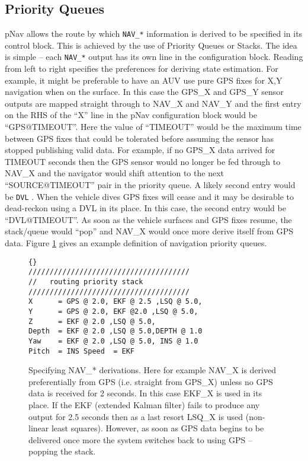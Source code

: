 \documentclass[a4paper,10pt]{article}
\newcommand{\Code}[1]{\texttt{#1} }
\newcommand{\code}[1]{\Code{#1} }
\begin{document}
\subsection{Priority Queues}
pNav allows the route by which \code{NAV\_*} information is
derived to be specified in its control block. This is achieved by
the use of Priority Queues or Stacks. The idea is simple -- each
\code{NAV\_*} output has its own line in the configuration block.
Reading from left to right specifies the preferences for deriving
state estimation. For example, it might be preferable to have an
AUV use pure GPS fixes for X,Y navigation when on the surface. In
this case the GPS\_X and GPS\_Y sensor outputs are mapped straight
through to NAV\_X and NAV\_Y and the first entry on the RHS of the ``X'' line
in the pNav configuration block would be ``GPS@TIMEOUT''. Here the
value of ``TIMEOUT'' would be the maximum time between GPS fixes
that could be tolerated before assuming the sensor has stopped
publishing valid data. For example, if no GPS\_X data arrived for
TIMEOUT seconds then the GPS sensor would no longer be fed through
to NAV\_X and the navigator would shift attention to the next
``SOURCE@TIMEOUT'' pair in the priority queue. A likely second
entry would be \code{DVL}. When the vehicle dives GPS fixes will
cease and it may be desirable to dead-reckon using a DVL in its
place. In this case, the second entry would be ``DVL@TIMEOUT''. As
soon as the vehicle surfaces and GPS fixes resume, the stack/queue
would ``pop'' and NAV\_X would once more derive itself from GPS
data. Figure \ref{fig:PriorityQueues} gives an example definition
of navigation priority queues.
\begin{figure}
\begin{lstlisting}[]{}
//////////////////////////////////////
//   routing priority stack
//////////////////////////////////////
X      = GPS @ 2.0, EKF @ 2.5 ,LSQ @ 5.0,
Y      = GPS @ 2.0, EKF @2.0 ,LSQ @ 5.0,
Z      = EKF @ 2.0 ,LSQ @ 5.0,
Depth  = EKF @ 2.0 ,LSQ @ 5.0,DEPTH @ 1.0
Yaw    = EKF @ 2.0 ,LSQ @ 5.0, INS @ 1.0
Pitch  = INS Speed  = EKF
\end{lstlisting}
\caption{Specifying NAV\_* derivations. Here for example NAV\_X is
derived preferentially from GPS (i.e. straight from GPS\_X) unless
no GPS data is received for 2 seconds. In this case EKF\_X is used
in its place. If the EKF (extended Kalman filter) fails to produce
any output for 2.5 seconds then as a last resort LSQ\_X is used
(non-linear least squares). However, as soon as GPS data begins to
be delivered once more the system switches back to using GPS
-- popping the stack.}
\label{fig:PriorityQueues}
\end{figure}
\end{document}
